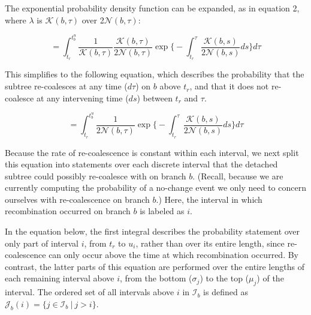 \documentclass[11pt]{article}
\begin{document}
\noindent The exponential probability density function can be expanded, as in 
equation 2, where $\lambda$ is $\mathcal{K}(b,\tau)$ over 
2$\mathcal{N}(b,\tau)$:

\begin{equation}
	= \int_{t_r}^{t_b^u} 
	\frac{1}{\mathcal{K}(b,\tau)} 
	\frac{\mathcal{K}(b,\tau)}{2\mathcal{N}(b,\tau)}
	\exp \bigg\{
		-\int_{t_r}^{\tau} \frac{\mathcal{K}(b,s)}{2\mathcal{N}(b,s)}ds
		\bigg\} d\tau
\end{equation}

\noindent This simplifies to the following equation, which describes the probability that
the subtree re-coalesces at any time ($d\tau$) on $b$ above $t_r$, and 
that it does not re-coalesce at any intervening time ($ds$) between 
$t_r$ and $\tau$.

\begin{equation}
	= \int_{t_r}^{t_b^u}
	\frac{1}{2\mathcal{N}(b,\tau)}
	\exp \bigg\{
		-\int_{t_r}^{\tau} \frac{\mathcal{K}(b,s)}{2\mathcal{N}(b,s)}ds
		\bigg\} d\tau
\end{equation}

\noindent Because the rate of re-coalescence is constant within each interval, 
we next split this equation into statements over each discrete interval that the
detached subtree could possibly re-coalesce with on branch $b$. (Recall, because
we are currently computing the probability of a no-change event we only need
to concern ourselves with re-coalescence on branch $b$.)
Here, the interval in which recombination occurred on branch $b$ is labeled
as $i$. 

In the equation below, the first integral describes the probability statement
over only part of interval $i$, from $t_r$ to $u_i$, rather than over its entire 
length, since re-coalescence can only occur above the time at which recombination 
occurred. By contrast, the latter parts of this equation are performed over the
entire lengths of each remaining interval above $i$, from the 
bottom ($\sigma_j$) to the top ($\mu_j$) of the interval.
The ordered set of all intervals above $i$ in $\mathcal{I}_b$ 
is defined as $\mathcal{J}_b(i) = \{j \in \mathcal{I}_b ~|~ j > i \}$. 
\end{document}
